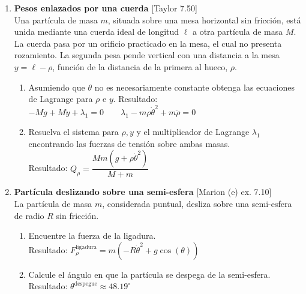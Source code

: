 \documentclass[11pt, spanish, a4paper, twoside]{article}
\begin{document}
\begin{enumerate}
	\item
	\begin{minipage}[t][7cm]{0.65\textwidth}
		\textbf{Pesos enlazados por una cuerda} [Taylor 7.50]\\
		Una partícula de masa \(m\), situada sobre una mesa horizontal sin fricción, está unida mediante una cuerda ideal de longitud \(\ell\) a otra partícula de masa \(M\).
		La cuerda pasa por un orificio practicado en la mesa, el cual no presenta rozamiento.
		La segunda pesa pende vertical con una distancia a la mesa \(y = \ell - \rho\), función de la distancia de la primera al hueco, \(\rho\).
		\begin{enumerate}
			\item Asumiendo que \(\theta\) no es necesariamente constante obtenga las ecuaciones de Lagrange para \(\rho\) e  \(y\). Resultado:\\ \(- M g + M \ddot{y} + \lambda_{1} = 0 \qquad \lambda_{1} - m \rho \dot{\theta}^{2} + m \ddot{\rho} = 0\)
			\item Resuelva el sistema para \(\rho, y\) y el multiplicador de Lagrange \(\lambda_1\) encontrando las fuerzas de tensión sobre ambas masas.\\
			Resultado: \(Q_{\rho} = \dfrac{M m \left(g + \rho \dot{\theta}^{2}\right)}{M + m}\)
		\end{enumerate}
	\end{minipage}
	\begin{minipage}[c][-1cm][t]{0.3\textwidth}
		
	\end{minipage}


	\item
	\begin{minipage}[t][4.5cm]{0.62\textwidth}
		\textbf{Partícula deslizando sobre una semi-esfera} [Marion (e) ex. 7.10]\\
		La partícula de masa \(m\), considerada puntual, desliza sobre una semi-esfera de radio \(R\) sin fricción.
		\begin{enumerate}
			\item Encuentre la fuerza de la ligadura.\\
			Resultado: \(F^\mathrm{ligadura}_{\rho} = m \left(- R \dot{\theta}^{2} + g \cos{\left(\theta \right)}\right)\)
			\item Calcule el ángulo en que la partícula se despega de la semi-esfera.\\
			Resultado: \(\theta^\mathrm{despegue} \approx 48.19^\circ\) 
		\end{enumerate}
	\end{minipage}
	\begin{minipage}[c][0cm][t]{0.3\textwidth}
		
	\end{minipage}
	

\end{enumerate}
\end{document}
